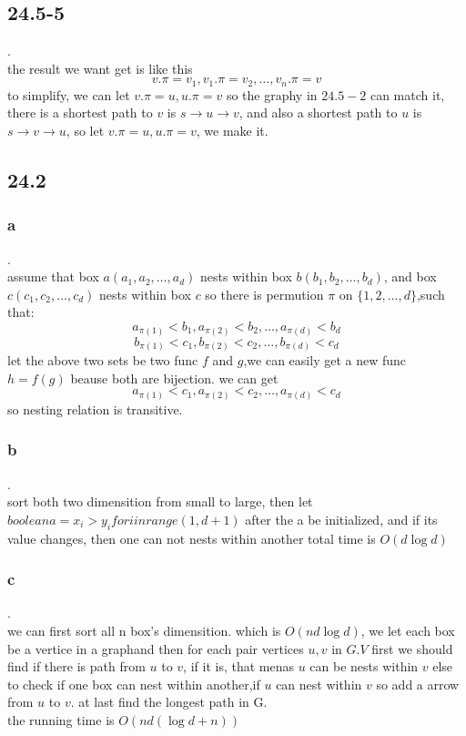 \documentclass[a4paper,UTF8]{article}
\theoremstyle{definition}
\begin{document}
 \subsection*{24.5-5}
.\\
the result we want get is like this \\
$$v.\pi =v_1, v_1.\pi=v_2,\ldots ,v_n.\pi=v$$
to simplify, we can let $v.\pi=u, u.\pi=v$
so  the graphy in $24.5-2$ can match it, there is a shortest
path to $v$ is $s\to u \to v$, and also a shortest path to $u$ is
$s\to v \to u$, so let $v.\pi=u, u.\pi=v$, we make it.


\subsection*{24.2}

\subsubsection*{a}
.\\
assume that box $a(a_1,a_2,\ldots,a_d)$ nests within box $b(b_1,b_2,\ldots,b_d)$, and box $c(c_1,c_2,\dots,c_d)$ nests within box $c$
so there is permution $\pi$ on $\{1,2,\ldots,d\}$,such that:
$$a_{\pi(1)}<b_1,a_{\pi(2)}<b_2,\ldots,a_{\pi(d)}<b_d$$
$$b_{\pi(1)}<c_1,b_{\pi(2)}<c_2,\ldots,b_{\pi(d)}<c_d$$
let the above two sets be two func $f$ and $g$,we can easily get a new func $h=f(g)$
beause both are bijection.
we can get  $$a_{\pi(1)}<c_1,a_{\pi(2)}<c_2,\ldots,a_{\pi(d)}<c_d$$
so nesting relation is transitive.
\subsubsection*{b}
.\\
sort both two dimensition  from small to large, then
let $boolean a = x_i>y_i for i in range(1,d+1)$
after the a be initialized, and if its value changes, then one can not nests within another
total time is $O(d\log d)$

\subsubsection*{c}
.\\
we can first sort all n box's dimensition. which is $O(nd\log d)$,
we let each box be a vertice in a graphand then for each pair vertices $u,v$ in $G.V$
first we should find if there is path from $u$ to $v$, if it is, that menas $u$ can be nests within $v$
else to check if one box can nest within another,if $u$ can nest within $v$ so add a arrow from $u$ to $v$.
at last find the longest path in G.\\
the running time is $O(nd(\log d+n))$
\end{document}

